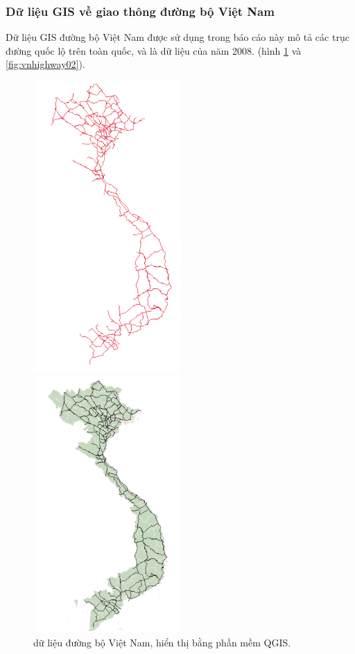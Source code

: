 \documentclass[14pt, oneside, a4paper, openany]{scrartcl}
\begin{document}
\subsubsection{Dữ liệu GIS về giao thông đường bộ Việt Nam}
Dữ liệu GIS đường bộ Việt Nam được sử dụng trong báo cáo này mô tả các trục đường quốc lộ trên toàn quốc, và là dữ liệu của năm 2008. (hình \ref{fig:vnhighway01} và \ref{fig:vnhighway02}).
\begin{figure}
	\centering
	\begin{minipage}{0.7\textwidth}
		\centering
		\includegraphics[width=0.5\textwidth]{figures/vietnamroad.png} %
		\caption[Dữ liệu đường bộ Việt Nam]{dữ liệu đường bộ Việt Nam, hiển thị bằng phần mềm QGIS.}
		\label{fig:vnhighway01}
	\end{minipage}\hfill
	\begin{minipage}{0.7\textwidth}
		\centering
		\includegraphics[width=0.5\textwidth]{figures/vietnamroad03.png} %

\end{minipage}
\end{figure}
\end{document}
